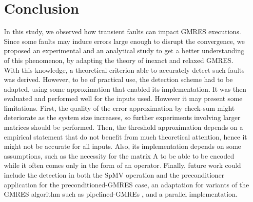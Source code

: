 \documentclass[twoside]{article}
\begin{document}
  \section{Conclusion}
  In this study, we observed how transient faults can impact GMRES executions. Since some faults may induce errors large enough to disrupt the convergence, we proposed an experimental and an analytical study to get a better understanding of this phenomenon, by adapting the theory of inexact and relaxed GMRES. With this knowledge, a theoretical criterion able to accurately detect such faults was derived. However, to be of practical use, the detection scheme had to be adapted, using some approximation that enabled its implementation. It was then evaluated and performed well for the inputs used. However it may present some limitations. First, the quality of the error approximation by check-sum might deteriorate as the system size increases, so further experiments involving larger matrices should be performed. Then, the threshold approximation depends on a empirical statement that do not benefit from much theoretical attention, hence it might not be accurate for all inputs. Also, its implementation depends on some assumptions, such as the necessity for the matrix A to be able to be encoded while it often comes only in the form of an operator.
  Finally, future work could include the detection in both the SpMV operation and the preconditioner application for the preconditioned-GMRES case, an adaptation for variants of the GMRES algorithm such as pipelined-GMREs \cite{pipelined_gmres}, and a parallel implementation.



  \newpage



  \newpage


  \newpage
  
\end{document}
